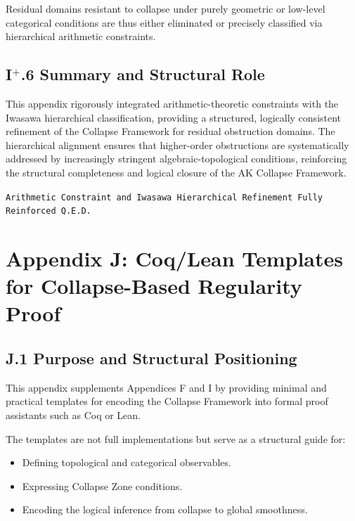 \documentclass[11pt]{article}
\begin{document}
Residual domains resistant to collapse under purely geometric or low-level categorical conditions are thus either eliminated or precisely classified via hierarchical arithmetic constraints.

\subsection*{I$^{+}$.6 Summary and Structural Role}

This appendix rigorously integrated arithmetic-theoretic constraints with the Iwasawa hierarchical classification, providing a structured, logically consistent refinement of the Collapse Framework for residual obstruction domains.  
The hierarchical alignment ensures that higher-order obstructions are systematically addressed by increasingly stringent algebraic-topological conditions, reinforcing the structural completeness and logical closure of the AK Collapse Framework.

\begin{flushright}
\texttt{Arithmetic Constraint and Iwasawa Hierarchical Refinement \quad Fully Reinforced \quad Q.E.D.}
\end{flushright}



\section*{Appendix J: Coq/Lean Templates for Collapse-Based Regularity Proof}

\subsection*{J.1 Purpose and Structural Positioning}

This appendix supplements Appendices F and I by providing minimal and practical templates for encoding the Collapse Framework into formal proof assistants such as Coq or Lean.

The templates are not full implementations but serve as a structural guide for:

\begin{itemize}
  \item Defining topological and categorical observables.
  \item Expressing Collapse Zone conditions.
  \item Encoding the logical inference from collapse to global smoothness.
\end{itemize}
\end{document}
